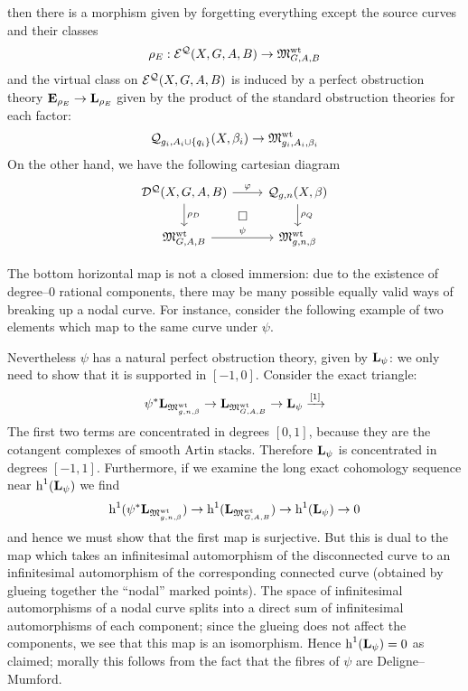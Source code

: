 then there is a morphism given by forgetting everything except the source curves and their classes
\begin{equation*} \rho_E : \mathcal{E^Q}(X,G,A,B) \rightarrow \mathfrak M_{G,A,B}^{\operatorname{wt}} \end{equation*}
and the virtual class on $\mathcal{E^Q}(X,G,A,B)$ is induced by a perfect obstruction theory $\mathbf{E}_{\rho_E} \rightarrow \mathbf{L}_{\rho_E}$ given by the product of the standard obstruction theories for each factor:
\begin{equation*} \mathcal{Q}_{g_i,A_i\cup\{q_i\}}(X,\beta_i)\rightarrow \mathfrak M_{g_i,A_i,\beta_i}^{\operatorname{wt}} \end{equation*}
On the other hand, we have the following cartesian diagram
\begin{equation} \label{Full quasimap diagram}
\begin{tikzcd}
\D{X}{G,A}{B} \ar[r,"\varphi"] \ar[d,"\rho_D"] \ar[rd,phantom,"\square"] & \Q{g}{n}{X}{\beta} \ar[d,"\rho_Q"] \\
\MM_{G,A,B}^{\operatorname{wt}} \ar[r,"\psi"] & \MM_{g,n,\beta}^{\operatorname{wt}}
\end{tikzcd}
\end{equation}

The bottom horizontal map is not a closed immersion: due to the existence of degree--$0$ rational components, there may be many possible equally valid ways of breaking up a nodal curve. For instance, consider the following example of two elements which map to the same curve under $\psi$.

\begin{center}

\end{center}
Nevertheless $\psi$ has a natural perfect obstruction theory, given by $\mathbf{L}_{\psi}$: we only need to show that it is supported in $[-1,0]$. Consider the exact triangle:
\begin{equation*} \psi^* \mathbf{L}_{\mathfrak M_{g,n,\beta}^{\operatorname{wt}}} \rightarrow \mathbf{L}_{\mathfrak M_{G,A,B}^{\operatorname{wt}}} \rightarrow \mathbf{L}_\psi \xrightarrow{[1]} \end{equation*}
The first two terms are concentrated in degrees $[0,1]$, because they are the cotangent complexes of smooth Artin stacks. Therefore $\mathbf{L}_\psi$ is concentrated in degrees $[-1,1]$. Furthermore, if we examine the long exact cohomology sequence near $\operatorname{h}^1(\mathbf{L}_\psi)$ we find
\begin{equation*} \operatorname{h}^1(\psi^* \mathbf{L}_{\mathfrak M_{g,n,\beta}^{\operatorname{wt}}}) \rightarrow \operatorname{h}^1(\mathbf{L}_{\mathfrak M_{G,A,B}^{\operatorname{wt}}}) \rightarrow \operatorname{h}^1(\mathbf{L}_\psi) \rightarrow 0 \end{equation*}
and hence we must show that the first map is surjective. But this is dual to the map which takes an infinitesimal automorphism of the disconnected curve to an infinitesimal automorphism of the corresponding connected curve (obtained by glueing together the ``nodal'' marked points). The space of infinitesimal automorphisms of a nodal curve splits into a direct sum of infinitesimal automorphisms of each component; since the glueing does not affect the components, we see that this map is an isomorphism. Hence $\operatorname{h}^1(\mathbf{L}_\psi) = 0$ as claimed; morally this follows from the fact that the fibres of $\psi$ are Deligne--Mumford.

